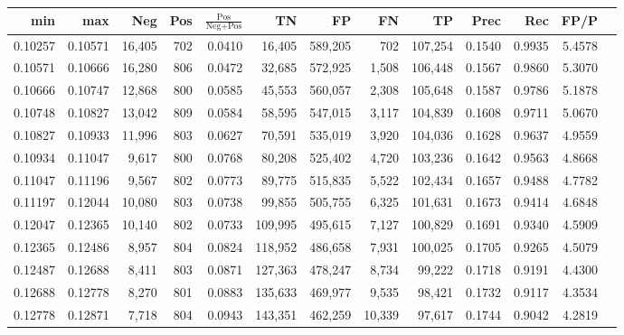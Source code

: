 \begin{tabular}{rrrrrrrrrrrrr}
\toprule
    min &     max &    Neg & Pos & $\frac{\text{Pos}}{\text{Neg}+\text{Pos}}$ &      TN &      FP &      FN &      TP &   Prec &    Rec &   FP/P \\
\midrule
0.10257 & 0.10571 & 16,405 & 702 &                                     0.0410 &  16,405 & 589,205 &     702 & 107,254 & 0.1540 & 0.9935 & 5.4578 \\
0.10571 & 0.10666 & 16,280 & 806 &                                     0.0472 &  32,685 & 572,925 &   1,508 & 106,448 & 0.1567 & 0.9860 & 5.3070 \\
0.10666 & 0.10747 & 12,868 & 800 &                                     0.0585 &  45,553 & 560,057 &   2,308 & 105,648 & 0.1587 & 0.9786 & 5.1878 \\
0.10748 & 0.10827 & 13,042 & 809 &                                     0.0584 &  58,595 & 547,015 &   3,117 & 104,839 & 0.1608 & 0.9711 & 5.0670 \\
0.10827 & 0.10933 & 11,996 & 803 &                                     0.0627 &  70,591 & 535,019 &   3,920 & 104,036 & 0.1628 & 0.9637 & 4.9559 \\
0.10934 & 0.11047 &  9,617 & 800 &                                     0.0768 &  80,208 & 525,402 &   4,720 & 103,236 & 0.1642 & 0.9563 & 4.8668 \\
0.11047 & 0.11196 &  9,567 & 802 &                                     0.0773 &  89,775 & 515,835 &   5,522 & 102,434 & 0.1657 & 0.9488 & 4.7782 \\
0.11197 & 0.12044 & 10,080 & 803 &                                     0.0738 &  99,855 & 505,755 &   6,325 & 101,631 & 0.1673 & 0.9414 & 4.6848 \\
0.12047 & 0.12365 & 10,140 & 802 &                                     0.0733 & 109,995 & 495,615 &   7,127 & 100,829 & 0.1691 & 0.9340 & 4.5909 \\
0.12365 & 0.12486 &  8,957 & 804 &                                     0.0824 & 118,952 & 486,658 &   7,931 & 100,025 & 0.1705 & 0.9265 & 4.5079 \\
0.12487 & 0.12688 &  8,411 & 803 &                                     0.0871 & 127,363 & 478,247 &   8,734 &  99,222 & 0.1718 & 0.9191 & 4.4300 \\
0.12688 & 0.12778 &  8,270 & 801 &                                     0.0883 & 135,633 & 469,977 &   9,535 &  98,421 & 0.1732 & 0.9117 & 4.3534 \\
0.12778 & 0.12871 &  7,718 & 804 &                                     0.0943 & 143,351 & 462,259 &  10,339 &  97,617 & 0.1744 & 0.9042 & 4.2819 \\

\end{tabular}
